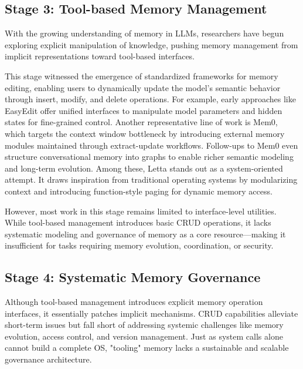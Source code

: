 \documentclass[]{memtensor}
\begin{document}
\subsection{Stage 3: Tool-based Memory Management}

With the growing understanding of memory in LLMs, researchers have begun exploring explicit manipulation of knowledge, pushing memory management from implicit representations toward tool-based interfaces.

This stage witnessed the emergence of standardized frameworks for memory editing, enabling users to dynamically update the model’s semantic behavior through insert, modify, and delete operations. For example, early approaches like EasyEdit\cite{zhang_easyedit_2024,xu_easyedit2_2025} offer unified interfaces to manipulate model parameters and hidden states for fine-grained control.
Another representative line of work is Mem0\cite{chhikara_mem0_2025}, which targets the context window bottleneck by introducing external memory modules maintained through extract-update workflows. Follow-ups to Mem0 even structure conversational memory into graphs to enable richer semantic modeling and long-term evolution.
Among these, Letta\cite{packer_memgpt_2024} stands out as a system-oriented attempt. It draws inspiration from traditional operating systems by modularizing context and introducing function-style paging for dynamic memory access.

However, most work in this stage remains limited to interface-level utilities. While tool-based management introduces basic CRUD operations, it lacks systematic modeling and governance of memory as a core resource—making it insufficient for tasks requiring memory evolution, coordination, or security.

\subsection{Stage 4: Systematic Memory Governance}
Although tool-based management introduces explicit memory operation interfaces, it essentially patches implicit mechanisms.
CRUD capabilities alleviate short-term issues but fall short of addressing systemic challenges like memory evolution, access control, and version management.
Just as system calls alone cannot build a complete OS, "tooling" memory lacks a sustainable and scalable governance architecture.
\end{document}
